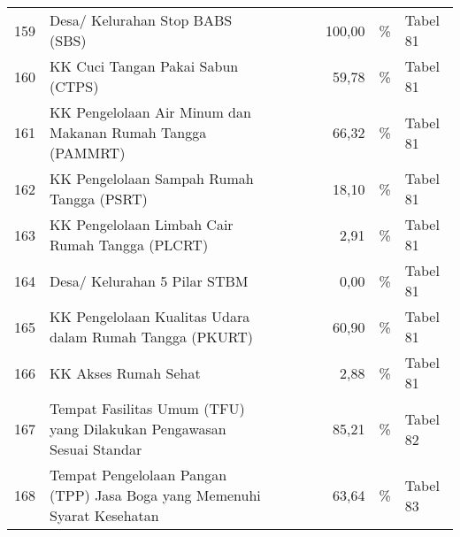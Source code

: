 \begin{small}
\begin{longtable}{rY{12em}rrrrY{5em}Y{5em}}
	159 & Desa/ Kelurahan Stop BABS (SBS)                                             &        &        &                    &   100,00 & \%                             & Tabel 81 \\
	160 & KK Cuci Tangan Pakai Sabun (CTPS)                                           &        &        &                    &    59,78 & \%                             & Tabel 81 \\
	161 & KK Pengelolaan Air Minum dan Makanan Rumah Tangga (PAMMRT)                  &        &        &                    &    66,32 & \%                             & Tabel 81 \\
	162 & KK Pengelolaan Sampah Rumah Tangga (PSRT)                                   &        &        &                    &    18,10 & \%                             & Tabel 81 \\
	163 & KK Pengelolaan Limbah Cair Rumah Tangga (PLCRT)                             &        &        &                    &     2,91 & \%                             & Tabel 81 \\
	164 & Desa/ Kelurahan 5 Pilar STBM                                                &        &        &                    &     0,00 & \%                             & Tabel 81 \\
	165 & KK Pengelolaan Kualitas Udara dalam Rumah Tangga (PKURT)                    &        &        &                    &    60,90 & \%                             & Tabel 81 \\
	166 & KK Akses Rumah Sehat                                                        &        &        &                    &     2,88 & \%                             & Tabel 81 \\
	167 & Tempat Fasilitas Umum (TFU) yang Dilakukan Pengawasan Sesuai Standar        &        &        &                    &    85,21 & \%                             & Tabel 82 \\
	168 & Tempat Pengelolaan Pangan (TPP) Jasa Boga yang Memenuhi Syarat Kesehatan    &        &        &                    &    63,64 & \%                             & Tabel 83 \\ 
	 \bottomrule
\end{longtable}%
\end{small}

